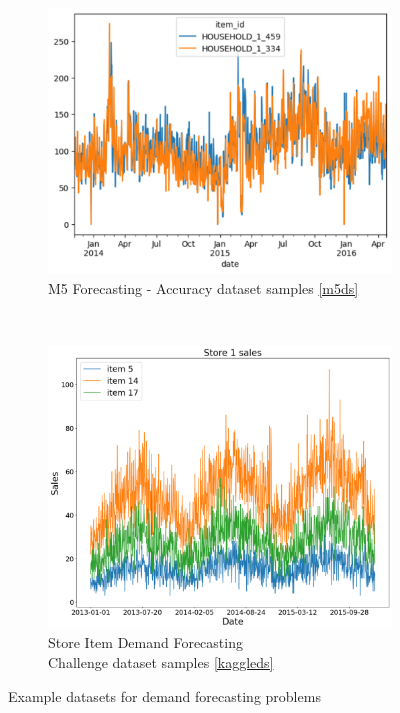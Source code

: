 \begin{figure}[t]
    \centering
    \begin{subfigure}[t]{0.45\textwidth}
        \includegraphics[width=\textwidth]{chapters/04_feature_importance_estimation/img/m5_lin}
        \caption{M5 Forecasting - Accuracy dataset samples \ref{m5ds}}
        \label{fig:m5_dataset}
    \end{subfigure} %
    ~%
    \begin{subfigure}[t]{0.45\textwidth}
        \includegraphics[width=\textwidth]{chapters/04_feature_importance_estimation/img/kaggle_demand}
        \caption{Store Item Demand Forecasting \\ Challenge dataset samples \ref{kaggleds}}
        \label{fig:kaggle_dataset}
    \end{subfigure}
    \caption{Example datasets for demand forecasting problems}
    \label{fig:datasets}
\end{figure}

